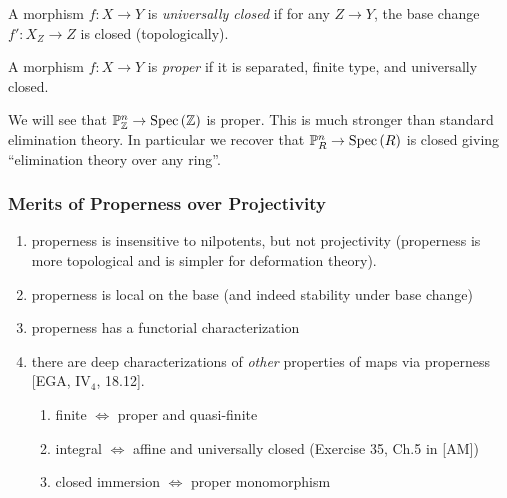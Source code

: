 \documentclass[12pt]{article}
\begin{document}
\begin{defn}
A morphism $f : X \to Y$ is \textit{universally closed} if for any $Z \to Y$, the base change $f' : X_Z \to Z$ is closed (topologically).
\end{defn}

\begin{defn}
A morphism $f : X \to Y$ is \textit{proper} if it is separated, finite type, and universally closed.
\end{defn}

\begin{rmk}
We will see that $\mathbb{P}^n_{\mathbb{Z}} \to \mathrm{Spec}\left( \mathbb{Z} \right)$ is proper. This is much stronger than standard elimination theory. In particular we recover that $\mathbb{P}^n_R \to \mathrm{Spec}\left( R \right)$ is closed giving ``elimination theory over any ring''. 
\end{rmk}

\subsubsection{Merits of Properness over Projectivity}

\begin{enumerate}
\item properness is insensitive to nilpotents, but not projectivity (properness is more topological and is simpler for deformation theory).
\item properness is local on the base (and indeed stability under base change)
\item properness has a functorial characterization
\item there are deep characterizations of \textit{other} properties of maps via properness [EGA, IV$_4$, 18.12].
\begin{enumerate}
\item finite $\iff$ proper and quasi-finite
\item integral $\iff$ affine and universally closed (Exercise 35, Ch.5 in [AM])
\item closed immersion $\iff$ proper monomorphism
\end{enumerate}
\end{enumerate}
\end{document}
